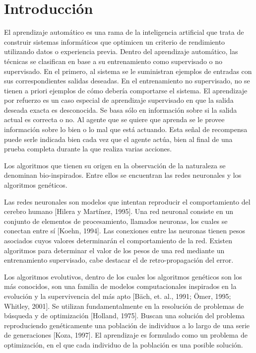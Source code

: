 \documentclass[a4paper,11pt]{article}
\begin{document}
\newpage

\tableofcontents

\newpage


\section{ Introducci\'on}\label{intro}

 El aprendizaje autom\'atico es una rama de la inteligencia artificial que trata de construir sistemas inform\'aticos que optimicen un criterio de rendimiento utilizando datos o experiencia previa. Dentro del aprendizaje autom\'atico, las t\'ecnicas se clasifican en base a su entrenamiento como supervisado o no supervisado. En el primero, al sistema se le suministran ejemplos de entradas con sus correspondientes salidas deseadas. En el entrenamiento no supervisado, no se tienen a priori ejemplos de c\'omo deber\'ia comportarse el sistema. El aprendizaje por refuerzo es un caso especial de aprendizaje supervisado en que la salida deseada exacta es desconocida. Se basa s\'olo en informaci\'on sobre si la salida actual es correcta o no. Al agente que se quiere que aprenda se le provee informaci\'on sobre lo bien o lo mal que est\'a actuando. Esta se\~nal de recompensa puede serle indicada bien cada vez que el agente act\'ua, bien al final de una prueba completa durante la que realiza varias acciones.

 Los algoritmos que tienen su origen en la observaci\'on de la naturaleza se denominan bio-inspirados. Entre ellos se encuentran las redes neuronales y los algoritmos gen\'eticos. 

 Las redes neuronales son modelos que intentan reproducir el comportamiento del cerebro humano [Hilera y Mart\'inez, 1995]. Una red neuronal consiste en un conjunto de elementos de procesamiento, llamados neuronas, los cuales se conectan entre s\'i [Koehn, 1994]. Las conexiones entre las neuronas tienen pesos asociados cuyos valores determinar\'an el comportamiento de la red. Existen algoritmos para determinar el valor de los pesos de una red mediante un entrenamiento supervisado, cabe destacar el de retro-propagaci\'on del error.

 Los algoritmos evolutivos, dentro de los cuales los algoritmos gen\'eticos son los m\'as conocidos, son una familia de modelos computacionales inspirados en la evoluci\'on y la supervivencia del m\'as apto [B\"ach, et. al., 1991; \"Omer, 1995; Whitley, 2001]. Se utilizan fundamentalmente en la resoluci\'on de problemas de b\'usqueda y de optimizaci\'on [Holland, 1975]. Buscan una soluci\'on del problema reproduciendo gen\'eticamente una poblaci\'on de individuos a lo largo de una serie de generaciones [Koza, 1997]. El aprendizaje es formulado como un problema de optimizaci\'on, en el que cada individuo de la poblaci\'on es una posible soluci\'on.
\end{document}
